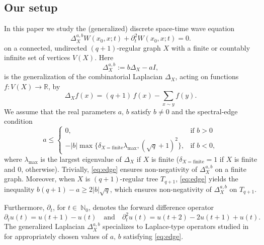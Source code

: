 \documentclass[reqno,10pt]{amsart}
\theoremstyle{definition}
\numberwithin{equation}{section}
\begin{document}
\subsection{Our setup}

In this paper we study the (generalized) discrete space-time wave equation 
\begin{equation}\label{wave_eq_disc}
\Delta_X^{a,b}W(x_0,x;t)+\partial_t^2 W(x_0,x;t)=0.
\end{equation}
on a connected, undirected $(q+1)$-regular graph $X$ with a finite or countably infinite set of vertices $V(X)$. Here  
\begin{equation*}\label{gen_Laplace}
    \Delta_{X}^{a,b}:= b\Delta_X - aI,
\end{equation*}
is the generalization of the combinatorial Laplacian $\Delta_X$, acting on functions $f:V(X)\to\mathbb{R}$, by
\begin{equation*}%
    \Delta_X f(x) = (q+1)\, f(x) - \sum_{x \sim y} f(y).
\end{equation*}
We assume that the real parameters $a,\,b$ satisfy $b\neq0$ and the spectral-edge condition
\begin{equation}\label{eq:edge}
a\leq \begin{cases}
0, & \text{if } b>0 \\
-|b|\max\{\delta_{X={\textrm{finite}}}\lambda_{\max}, (\sqrt{q}+1)^2\}, & \text{if } b<0,
\end{cases}
\end{equation}
where $\lambda_{\max}$ is the largest eigenvalue of $\Delta_X$ if $X$ is finite ($\delta_{X={\textrm{finite}}}=1$ if $X$ is finite and $0$, otherwise). Trivially, \eqref{eq:edge} ensures non-negativity of $\Delta_{X}^{a,b}$ on a finite graph. Moreover, when $X$ is $(q+1)$-regular tree $T_{q+1}$, \eqref{eq:edge} yields the inequality $b(q+1)-a\geq 2|b|\sqrt{q}$, which ensures non-negativity of  $\Delta_{X}^{a,b}$  on $T_{q+1}$. 

Furthermore, $\partial_t$, for $t\in\ \mathbb{N}_0$, denotes the forward difference operator
\[
\partial_t u(t)=u(t+1)-u(t) \quad \text{and} \quad \partial_t^2 u(t)=u(t+2)-2u(t+1)+u(t).
\]
The generalized Laplacian $\Delta_{X}^{a,b}$ specializes to Laplace-type operators studied in \cite{AMPS13, BL13, CRS07, DS-PB18, MS99, Pe25} for appropriately chosen  values of $a,\,b$ satisfying \eqref{eq:edge}.
\end{document}
